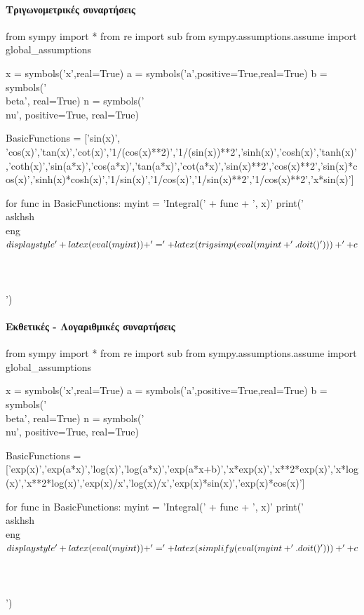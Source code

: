 \documentclass[11pt,a3paper,twocolumn]{article}
\newcounter{askhsh}
\newcommand{\askhsh}{{\large\theaskhsh.}\ \addtocounter{askhsh}{1}}
\newcommand{\eng}[1]{\selectlanguage{english}#1\selectlanguage{greek}}
\begin{document}
\paragraph{Τριγωνομετρικές συναρτήσεις}
\begin{sympycode}
from sympy import *
from re import sub
from sympy.assumptions.assume import global_assumptions

x = symbols('x',real=True)
a = symbols('a',positive=True,real=True)
b = symbols('\\beta', real=True)
n = symbols('\\nu', positive=True, real=True)

BasicFunctions = ['sin(x)', 'cos(x)','tan(x)','cot(x)','1/(cos(x)**2)','1/(sin(x))**2','sinh(x)','cosh(x)','tanh(x)','coth(x)','sin(a*x)','cos(a*x)','tan(a*x)','cot(a*x)','sin(x)**2','cos(x)**2','sin(x)*cos(x)','sinh(x)*cosh(x)','1/sin(x)','1/cos(x)','1/sin(x)**2','1/cos(x)**2','x*sin(x)']

for func in BasicFunctions:
	myint = 'Integral(' + func + ', x)'
	print('\\askhsh \\eng{$\\displaystyle'+latex(eval(myint)) + '=' +
	latex(trigsimp(eval(myint+'.doit()'))) + '+c$}\\\\\\\\')
\end{sympycode}

\paragraph{Εκθετικές - Λογαριθμικές συναρτήσεις}
\begin{sympycode}
from sympy import *
from re import sub
from sympy.assumptions.assume import global_assumptions

x = symbols('x',real=True)
a = symbols('a',positive=True,real=True)
b = symbols('\\beta', real=True)
n = symbols('\\nu', positive=True, real=True)

BasicFunctions = ['exp(x)','exp(a*x)','log(x)','log(a*x)','exp(a*x+b)','x*exp(x)','x**2*exp(x)','x*log(x)','x**2*log(x)','exp(x)/x','log(x)/x','exp(x)*sin(x)','exp(x)*cos(x)']

for func in BasicFunctions:
	myint = 'Integral(' + func + ', x)'
	print('\\askhsh \\eng{$\\displaystyle'+latex(eval(myint)) + '=' +
	latex(simplify(eval(myint+'.doit()'))) + '+c$}\\\\\\\\')
\end{sympycode}
\end{document}
